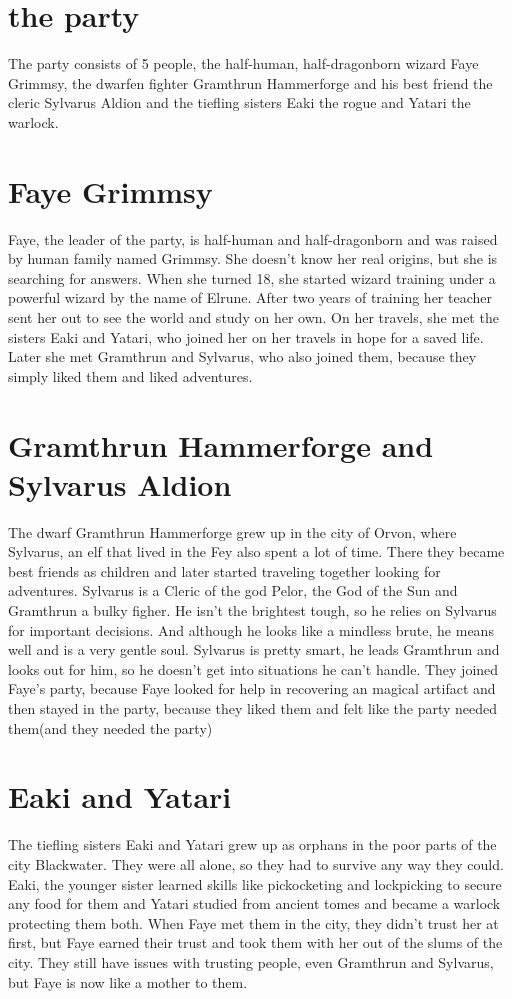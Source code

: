 \documentclass[oneside]{book}
\begin{document}
\chapter{the party}
	The party consists of 5 people, the half-human, half-dragonborn wizard Faye Grimmsy,
	the dwarfen fighter Gramthrun Hammerforge and his best friend the cleric Sylvarus Aldion
	and the tiefling sisters Eaki the rogue and Yatari the warlock.
\chapter{Faye Grimmsy}
	Faye, the leader of the party, is half-human and half-dragonborn and was raised by human family named Grimmsy. 
	She doesn't know her real origins, but she is searching for answers. When she turned 18, she started wizard training under a powerful wizard by the name of Elrune.
	After two years of training her teacher sent her out to see the world and study on her own. On her travels, she met the sisters Eaki and Yatari, who joined her on her travels in hope for a saved life.
	Later she met Gramthrun and Sylvarus, who also joined them, because they simply liked them and liked adventures.
	
\chapter{Gramthrun Hammerforge and Sylvarus Aldion}
	The dwarf Gramthrun Hammerforge grew up in the city of Orvon, where Sylvarus, an elf that lived in the Fey also spent a lot of time.
	There they became best friends as children and later started traveling together looking for adventures.
	Sylvarus is a Cleric of the god Pelor, the God of the Sun and Gramthrun a bulky figher. He isn't the brightest tough, so he relies on Sylvarus for important decisions.
	And although he looks like a mindless brute, he means well and is a very gentle soul.
	Sylvarus is pretty smart, he leads Gramthrun and looks out for him, so he doesn't get into situations he can't handle.
	They joined Faye's party, because Faye looked for help in recovering an magical artifact and then stayed in the party, because they liked them and felt like the party needed them(and they needed the party)
	
\chapter{Eaki and Yatari}
	The tiefling sisters Eaki and Yatari grew up as orphans in the poor parts of the city Blackwater. They were all alone, so they had to survive any way they could.
	Eaki, the younger sister learned skills like pickocketing and lockpicking to secure any food for them and Yatari studied from ancient tomes and became a warlock protecting them both.
	When Faye met them in the city, they didn't trust her at first, but Faye earned their trust and took them with her out of the slums of the city.
	They still have issues with trusting people, even Gramthrun and Sylvarus, but Faye is now like a mother to them.
\end{document}
